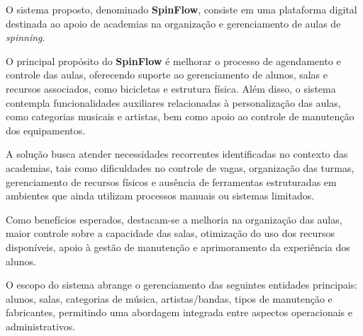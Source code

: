 

O sistema proposto, denominado \textbf{SpinFlow}, consiste em uma plataforma digital destinada ao apoio de academias na organização e gerenciamento de aulas de \textit{spinning}.

O principal propósito do \textbf{SpinFlow} é melhorar o processo de agendamento e controle das aulas, oferecendo suporte ao gerenciamento de alunos, salas e recursos associados, como bicicletas e estrutura física. Além disso, o sistema contempla funcionalidades auxiliares relacionadas à personalização das aulas, como categorias musicais e artistas, bem como apoio ao controle de manutenção dos equipamentos.

A solução busca atender necessidades recorrentes identificadas no contexto das academias, tais como dificuldades no controle de vagas, organização das turmas, gerenciamento de recursos físicos e ausência de ferramentas estruturadas em ambientes que ainda utilizam processos manuais ou sistemas limitados.

Como benefícios esperados, destacam-se a melhoria na organização das aulas, maior controle sobre a capacidade das salas, otimização do uso dos recursos disponíveis, apoio à gestão de manutenção e aprimoramento da experiência dos alunos.

O escopo do sistema abrange o gerenciamento das seguintes entidades principais: alunos, salas, categorias de música, artistas/bandas, tipos de manutenção e fabricantes, permitindo uma abordagem integrada entre aspectos operacionais e administrativos.